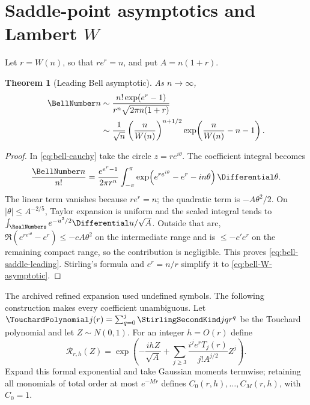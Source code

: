 \documentclass[11pt,a4paper,oneside,openany]{book}
\newtheorem{theorem}{Theorem}[chapter]
\theoremstyle{definition}
\theoremstyle{remark}
\begin{document}
\section{Saddle-point asymptotics and Lambert \texorpdfstring{$W$}{W}}
Let $r=W(n)$, so that $re^r=n$, and put $A=n(1+r)$.
\begin{theorem}[Leading Bell asymptotic]\label{thm:bell-leading-asymptotic}
As $n\to\infty$,
\begin{align}
 \BellNumber n
 &\sim \frac{n!\exp(e^r-1)}{r^n\sqrt{2\pi n(1+r)}}
 \label{eq:bell-saddle-leading}\\
 &\sim \frac1{\sqrt n}\left(\frac{n}{W(n)}\right)^{n+1/2}
       \exp\!\left(\frac{n}{W(n)}-n-1\right).
 \label{eq:bell-W-asymptotic}
\end{align}
\end{theorem}
\begin{proof}
In \eqref{eq:bell-cauchy} take the circle $z=re^{i\theta}$.  The coefficient
integral becomes
\[
 \frac{\BellNumber n}{n!}=
 \frac{e^{e^r-1}}{2\pi r^n}
 \int_{-\pi}^{\pi}
 \exp\!\left(e^{re^{i\theta}}-e^r-in\theta\right)\Differential\theta.
\]
The linear term vanishes because $re^r=n$; the quadratic term is
$-A\theta^2/2$.  On $|\theta|\le A^{-2/5}$, Taylor expansion is uniform and the
scaled integral tends to $\int_{\RealNumbers}e^{-u^2/2}\Differential u/\sqrt A$.  Outside that arc,
$\Re(e^{re^{i\theta}}-e^r)\le-cA\theta^2$ on the intermediate range and is
$\le-c'e^r$ on the remaining compact range, so the contribution is negligible.
This proves \eqref{eq:bell-saddle-leading}.  Stirling's formula and $e^r=n/r$
simplify it to \eqref{eq:bell-W-asymptotic}.
\end{proof}

The archived refined expansion used undefined symbols.  The following construction
makes every coefficient unambiguous.  Let
$\TouchardPolynomial j(r)=\sum_{q=0}^j\StirlingSecondKind jq r^q$ be the Touchard polynomial and let
$Z\sim N(0,1)$.  For an integer $h=O(r)$ define
\begin{equation}\label{eq:bell-saddle-correction-generator}
 \mathcal R_{r,h}(Z)=\exp\!\left(
 -\frac{ihZ}{\sqrt A}+
 \sum_{j\ge3}\frac{i^j e^rT_j(r)}{j!A^{j/2}}Z^j
 \right).
\end{equation}
Expand this formal exponential and take Gaussian moments termwise; retaining all
monomials of total order at most $e^{-Mr}$ defines $C_0(r,h),\ldots,C_M(r,h)$,
with $C_0=1$.
\end{document}
